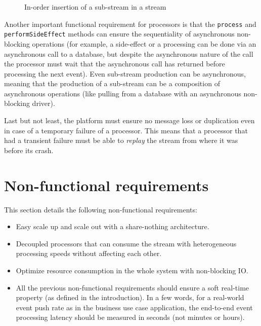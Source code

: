 \begin{figure}[h]
  \begin{center} 
    \caption{In-order insertion of a sub-stream in a stream}
    \label{fig:substream}
  \end{center}
\end{figure}

Another important functional requirement for processors is that the \verb|process| and \verb|performSideEffect| methods can ensure the
sequentiality of asynchronous non-blocking operations (for example, a side-effect or a processing can be done via an asynchronous call to a 
database, but despite the asynchronous nature of the call the processor must wait that the asynchronous call has returned
before processing the next event). Even sub-stream production can be asynchronous, meaning that the production of a sub-stream
can be a composition of asynchronous operations (like pulling from a database with an asynchronous non-blocking driver).

Last but not least, the platform must ensure no message loss or duplication even in case of a temporary failure of a processor. This means that a processor
that had a transient failure must be able to \textit{replay} the stream from where it was before its crash.

\section{Non-functional requirements}

This section details the following non-functional requirements:
\begin{itemize}
  \item Easy scale up and scale out with a share-nothing architecture.
  \item Decoupled processors that can consume the stream with heterogeneous processing speeds without affecting each other.
  \item Optimize resource consumption in the whole system with non-blocking IO.
  \item All the previous non-functional requirements should ensure a soft real-time property (as defined in the introduction). In a few words, for a real-world event push rate as in the business use case application, the end-to-end event processing latency should be measured in seconds (not minutes or hours).
\end{itemize}

